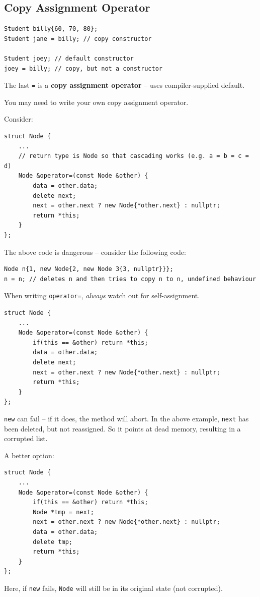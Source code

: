 \documentclass[11pt]{article}
\theoremstyle{definition}
\begin{document}
\subsection{Copy Assignment Operator}
\begin{lstlisting}
Student billy{60, 70, 80};
Student jane = billy; // copy constructor

Student joey; // default constructor
joey = billy; // copy, but not a constructor
\end{lstlisting}
The last {\tt =} is a {\bf copy assignment operator} -- uses compiler-supplied default. 

You may need to write your own copy assignment operator.

Consider:
\begin{lstlisting}
struct Node {
    ...
    // return type is Node so that cascading works (e.g. a = b = c = d)
    Node &operator=(const Node &other) {
        data = other.data;
        delete next;
        next = other.next ? new Node{*other.next} : nullptr;
        return *this;
    }
};
\end{lstlisting}
The above code is dangerous -- consider the following code:
\begin{lstlisting}
Node n{1, new Node{2, new Node 3{3, nullptr}}};
n = n; // deletes n and then tries to copy n to n, undefined behaviour
\end{lstlisting}
When writing {\tt operator=}, {\it always} watch out for self-assignment.
\begin{lstlisting}
struct Node {
    ...
    Node &operator=(const Node &other) {
        if(this == &other) return *this;
        data = other.data;
        delete next;
        next = other.next ? new Node{*other.next} : nullptr;
        return *this;
    }
};
\end{lstlisting}
{\tt new} can fail -- if it does, the method will abort. In the above example, {\tt next} has been deleted, but not reassigned. So it points at dead memory, resulting in a corrupted list. 

A better option:
\begin{lstlisting}
struct Node {
    ...
    Node &operator=(const Node &other) {
        if(this == &other) return *this;
        Node *tmp = next;
        next = other.next ? new Node{*other.next} : nullptr;
        data = other.data;
        delete tmp;
        return *this;
    }
};
\end{lstlisting}
Here, if {\tt new} fails, {\tt Node} will still be in its original state (not corrupted).
\end{document}
